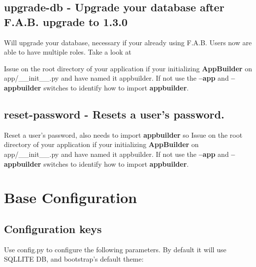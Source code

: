 \documentclass[letterpaper,10pt,english]{sphinxmanual}
\begin{document}
\subsection{\textbf{upgrade-db} - Upgrade your database after F.A.B. upgrade to 1.3.0}
\label{fabmanager:upgrade-db-upgrade-your-database-after-f-a-b-upgrade-to-1-3-0}
Will upgrade your database, necessary if your already using F.A.B. Users now are able to have multiple roles.
Take a look at {\hyperref[versionmigration::doc]{}}

Issue on the root directory of your application
if your initializing \textbf{AppBuilder} on app/\_\_init\_\_.py and have named it appbuilder. If not use the \textbf{--app} and
\textbf{--appbuilder} switches to identify how to import \textbf{appbuilder}.


\subsection{\textbf{reset-password} - Resets a user's password.}
\label{fabmanager:reset-password-resets-a-user-s-password}
Reset a user's password, also needs to import \textbf{appbuilder} so
Issue on the root directory of your application
if your initializing \textbf{AppBuilder} on app/\_\_init\_\_.py and have named it appbuilder. If not use the \textbf{--app} and
\textbf{--appbuilder} switches to identify how to import \textbf{appbuilder}.


\section{Base Configuration}
\label{config:base-configuration}\label{config::doc}

\subsection{Configuration keys}
\label{config:configuration-keys}
Use config.py to configure the following parameters. By default it will use SQLLITE DB, and bootstrap's default theme:
\end{document}
